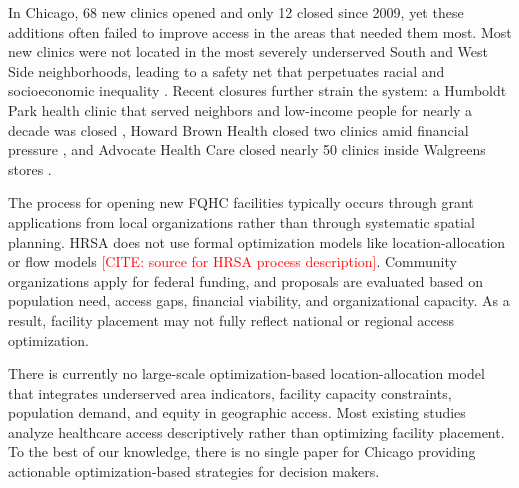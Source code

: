 \documentclass[11pt]{article}
\begin{document}
In Chicago, 68 new clinics opened and only 12 closed since 2009, yet these additions often failed to improve 
access in the areas that needed them most. Most new clinics were not located in the most severely underserved 
South and West Side neighborhoods, leading to a safety net that perpetuates racial and socioeconomic inequality 
\cite{kim2020uneven}. Recent closures further strain the system: a Humboldt Park health clinic that served 
neighbors and low-income people for nearly a decade was closed \cite{Bloom2023}, Howard Brown Health closed 
two clinics amid financial pressure \cite{Schencker2024}, and Advocate Health Care closed nearly 50 clinics 
inside Walgreens stores \cite{Japsen2025}.

The process for opening new FQHC facilities typically occurs through grant applications from local organizations 
rather than through systematic spatial planning. HRSA does not use formal optimization models like location-allocation
or flow models \textcolor{red}{[CITE: source for HRSA process description]}. Community organizations apply for federal funding, and proposals are evaluated based on population
need, access gaps, financial viability, and organizational capacity. As a result, facility placement may not fully
reflect national or regional access optimization.

There is currently no large-scale optimization-based location-allocation model that integrates underserved area 
indicators, facility capacity constraints, population demand, and equity in geographic access. Most existing studies 
analyze healthcare access descriptively rather than optimizing facility placement. To the best of our knowledge, there is no single paper for Chicago providing actionable optimization-based strategies for decision makers.
\end{document}
